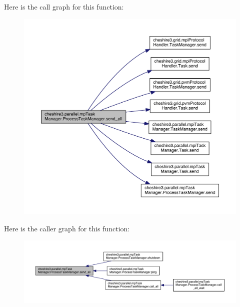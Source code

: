 Here is the call graph for this function\-:
\nopagebreak
\begin{figure}[H]
\begin{center}
\leavevmode
\includegraphics[width=350pt]{classcheshire3_1_1parallel_1_1mp_task_manager_1_1_process_task_manager_af565797d7e3231598177b7e12a38fea1_cgraph}
\end{center}
\end{figure}




Here is the caller graph for this function\-:
\nopagebreak
\begin{figure}[H]
\begin{center}
\leavevmode
\includegraphics[width=350pt]{classcheshire3_1_1parallel_1_1mp_task_manager_1_1_process_task_manager_af565797d7e3231598177b7e12a38fea1_icgraph}
\end{center}
\end{figure}



